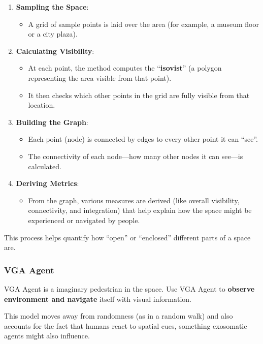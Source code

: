 \documentclass[a4paper, openany]{book}
\begin{document}
\begin{enumerate}
  \item \textbf{Sampling the Space}:
  \begin{itemize}
    \item A grid of sample points is laid over the area (for example, a museum floor or a city plaza).
  \end{itemize}
  \item \textbf{Calculating Visibility}:
  \begin{itemize} 
    \item At each point, the method computes the ``\textbf{isovist}'' (a polygon representing the area visible from that point).
    \item It then checks which other points in the grid are fully visible from that location.
  \end{itemize}
  \item \textbf{Building the Graph}:
  \begin{itemize}
    \item Each point (node) is connected by edges to every other point it can ``see''.
    \item The connectivity of each node—how many other nodes it can see—is calculated.
  \end{itemize}
  \item \textbf{Deriving Metrics}:
  \begin{itemize}
    \item From the graph, various measures are derived (like overall visibility, connectivity, and integration) that help explain how the space might be experienced or navigated by people.
  \end{itemize}
\end{enumerate}

This process helps quantify how ``open'' or ``enclosed'' different parts of a space are.

\subsubsection{VGA Agent}

VGA Agent is a imaginary pedestrian in the space. Use VGA Agent to \textbf{observe environment and navigate} itself with visual information.

This model moves away from randomness (as in a random walk) and also accounts for the fact that humans react to spatial cues, something exosomatic agents might also influence.
\end{document}
